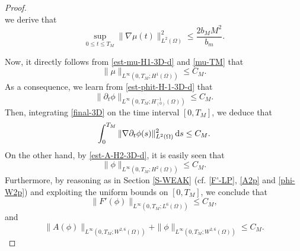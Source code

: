 \documentclass[11pt,reqno]{amsart}
\theoremstyle{remark}
\def\d{{\rm d}}
\numberwithin{equation}{section}
\def\d{{\rm d}}
\begin{document}
\begin{proof}
$$$$
we derive that
\begin{equation}
\label{mu-TM}
\sup_{0 \leq t \leq T_M} \|\nabla \mu (t)\|_{L^2(\Omega)}^2
\leq
\frac{2 b_M M^2}{b_m}.
\end{equation}

Now, it directly follows from \eqref{est-mu-H1-3D-d} and \eqref{mu-TM} that
\begin{equation}
\label{Glob_muH1_4-3D}
\| \mu\|_{L^\infty(0, T_M; H^1(\Omega))} \leq C_M.
\end{equation}
As a consequence, we learn from \eqref{est-phit-H-1-3D-d} that
\begin{equation}
\label{phit-inf-3D}
 \| \partial_t \phi \|_{L^\infty(0,T_M;  H^{-1}_{(0)}(\Omega))}\leq C_M.
\end{equation}
Then, integrating \eqref{final-3D} on the time interval $[0,T_M]$, we deduce that
\begin{equation}
\label{phit-H1-3D}
 \int_0^{T_M} \| \nabla \partial_t \phi (s)\|_{L^2(\Omega)}^2 \, \d s
\leq C_M.
\end{equation}
On the other hand, by \eqref{est-A-H2-3D-d}, it is easily seen that
\begin{equation}
\label{phiH2-3D}
\| \phi\|_{L^\infty(0,T_M; H^2(\Omega))} \leq C_M.
\end{equation}
Furthermore, by reasoning as in Section \ref{S-WEAK} (cf. \eqref{F'-LP}, \eqref{A2p} and \eqref{phi-W2p}) and exploiting the uniform bounds on $[0,T_M]$, we conclude that
$$\| F'(\phi)\|_{L^\infty(0,T_M; L^6(\Omega))}\leq C_M,$$
and
\begin{equation}
\label{Aphi-W26}
\| A(\phi)\|_{L^\infty(0,T_M; W^{2,6}(\Omega))}+\| \phi\|_{L^\infty(0,T_M; W^{2,6}(\Omega))}
\leq C_M.
\end{equation}


\end{proof}
\end{document}
